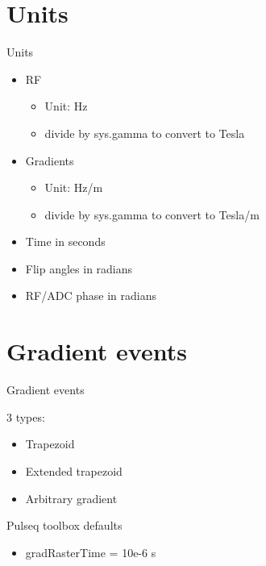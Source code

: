 \documentclass{beamer}
\begin{document}
\section{Units}
\begin{frame}{Units}

\begin{itemize}
    \item RF
        \begin{itemize}
        \item Unit: Hz
        \item divide by sys.gamma to convert to Tesla
        \end{itemize}
    \item Gradients
        \begin{itemize}
        \item Unit: Hz/m
        \item divide by sys.gamma to convert to Tesla/m
        \end{itemize}
    \item Time in seconds
    \item Flip angles in radians
    \item RF/ADC phase in radians
\end{itemize}


\end{frame}


\section{Gradient events}
\begin{frame}{Gradient events}

3 types:
\begin{itemize}
    \item Trapezoid
    \item Extended trapezoid
    \item Arbitrary gradient
\end{itemize}

\bigskip
Pulseq toolbox defaults
\begin{itemize}
    \item gradRasterTime = 10e-6 s
\end{itemize}

\end{frame}
\end{document}
